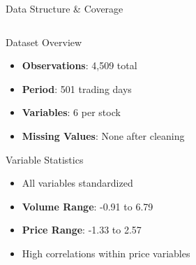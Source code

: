 \documentclass{beamer}
\begin{document}
\begin{frame}{Data Structure \& Coverage}
    \begin{columns}
        \begin{column}{0.48\textwidth}
            \begin{block}{Dataset Overview}
                \begin{itemize}
                    \item \textbf{Observations}: 4,509 total
                    \item \textbf{Period}: 501 trading days
                    \item \textbf{Variables}: 6 per stock
                    \item \textbf{Missing Values}: None after cleaning
                \end{itemize}
            \end{block}

            \begin{block}{Variable Statistics}
                \begin{itemize}\setlength{\itemsep}{0pt}
                    \item All variables standardized
                    \item \textbf{Volume Range}: -0.91 to 6.79
                    \item \textbf{Price Range}: -1.33 to 2.57
                    \item High correlations within price variables
                \end{itemize}
            \end{block}
        \end{column}


\end{columns}
\end{frame}
\end{document}
